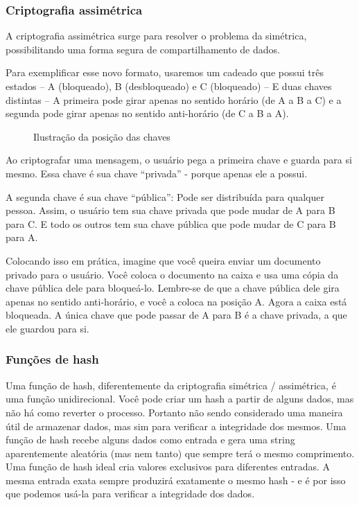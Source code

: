 \subsubsection{Criptografia assimétrica}
A criptografia assimétrica surge para resolver o problema da simétrica, possibilitando uma forma segura de compartilhamento de dados.

Para exemplificar esse novo formato, usaremos um cadeado que possui três estados – A (bloqueado), B (desbloqueado) e C (bloqueado) – E duas chaves distintas – A primeira pode girar apenas no sentido horário (de A a B a C) e a segunda pode girar apenas no sentido anti-horário (de C a B a A).

\vspace{1cm}
\begin{figure}[H] \centering 
  \caption{\label{fig:5} Ilustração da posição das chaves} 
\end{figure}

Ao criptografar uma mensagem, o usuário pega a primeira chave e guarda para si mesmo. Essa chave é sua chave ``privada'' - porque apenas ele a possui.

A segunda chave é sua chave ``pública'': Pode ser distribuída para qualquer pessoa. Assim, o usuário tem sua chave privada que pode mudar de A para B para C. E todo os outros tem sua chave pública que pode mudar de C para B para A.

Colocando isso em prática, imagine que você queira enviar um documento privado para o usuário. Você coloca o documento na caixa e usa uma cópia da chave pública dele para bloqueá-lo. Lembre-se de que a chave pública dele gira apenas no sentido anti-horário, e você a coloca na posição A. Agora a caixa está bloqueada. A única chave que pode passar de A para B é a chave privada, a que ele guardou para si.

\subsubsection{Funções de hash}
Uma função de hash, diferentemente da criptografia simétrica / assimétrica, é  uma função unidirecional.  Você  pode criar um hash a partir de alguns dados, mas não há como reverter o processo. Portanto não sendo considerado uma maneira útil de armazenar dados, mas sim para verificar a integridade dos mesmos.  Uma função de hash recebe alguns dados como entrada e gera uma string aparentemente aleatória (mas nem tanto) que sempre terá o mesmo comprimento. Uma função de hash ideal cria valores exclusivos para diferentes entradas. A mesma entrada exata sempre produzirá exatamente o mesmo hash - e é por isso que podemos usá-la para verificar a integridade dos dados.

